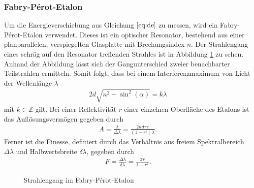\subsubsection{Fabry-Pérot-Etalon}
Um die Energieverschiebung aus Gleichung $\ref{eq:de}$ zu messen, wird ein Fabry-Pérot-Etalon verwendet. Dieses ist ein optischer Resonator, bestehend aus einer planparallelen, verspiegelten Glasplatte mit Brechungsindex $n$. Der Strahlengang eines schräg auf den Resonator treffenden Strahles ist in Abbildung \ref{fig:fabry} zu sehen. Anhand der Abbildung lässt sich der Gangunterschied zweier benachbarter Teilstrahlen ermitteln. Somit folgt, dass bei einem Interferenzmaximum von Licht der Wellenlänge $\lambda$
\begin{align}
  2d\sqrt{n^2-\sin^2(\alpha)}=k\lambda
\end{align}
mit $k \in \mathbb{Z}$ gilt. Bei einer Reflektivität $r$ einer einzelnen Oberfläche des Etalons ist das Auflösungsvermögen gegeben durch \cite{fabryperotaufloes}
\begin{align}
  A = \frac{\lambda}{\Delta \lambda}=\frac{2 n d \pi r}{(1-r^2)\lambda}.
\end{align}
Ferner ist die Finesse, definiert durch das Verhältnis aus freiem Spektralbereich $\Delta \lambda$ und Halbwertsbreite $\delta \lambda$, gegeben durch \cite{fabryperotaufloes}
\begin{align}
  F=\frac{\Delta \lambda}{\delta \lambda}=\frac{\pi r}{1-r^2}.
\end{align} 


\begin{figure}[h]
  \centering
  \caption{Strahlengang im Fabry-Pérot-Etalon}
  \label{fig:fabry}
\end{figure}

